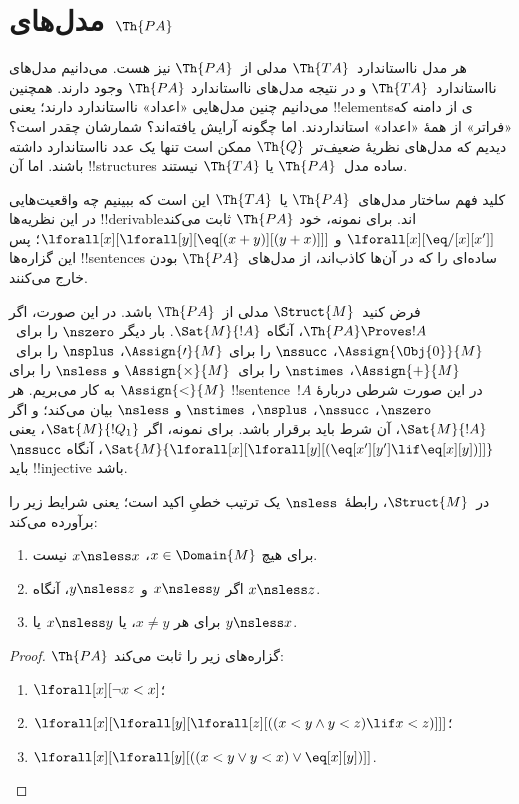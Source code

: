 \documentclass[../../../include/open-logic-section]{subfiles}
\begin{document}
\section{مدل‌های $\Th{PA}$}

\begin{explain}
هر مدل نااستاندارد~$\Th{TA}$ مدلی از~$\Th{PA}$ نیز هست. می‌دانیم
مدل‌های نااستاندارد~$\Th{TA}$ و در نتیجه مدل‌های نااستاندارد
$\Th{PA}$ وجود دارند. همچنین می‌دانیم چنین مدل‌هایی «اعداد»
نااستاندارد دارند؛ یعنی !!{element}sی از دامنه که «فراتر» از همهٔ
«اعداد» استانداردند. اما چگونه آرایش یافته‌اند؟ شمارشان چقدر است؟
دیدیم که مدل‌های نظریهٔ ضعیف‌تر~$\Th{Q}$ ممکن است تنها یک عدد
نااستاندارد داشته باشند. اما آن !!{structure}s ساده مدل~$\Th{PA}$ یا
$\Th{TA}$ نیستند.

کلید فهم ساختار مدل‌های~$\Th{PA}$ یا~$\Th{TA}$ این است که ببینیم چه
واقعیت‌هایی در این نظریه‌ها !!{derivable}اند. برای نمونه، خود
$\Th{PA}$ ثابت می‌کند
$\lforall[x][\eq/[x][x']]$ و
$\lforall[x][\lforall[y][\eq[(x+y)][(y+x)]]]$؛ پس این گزاره‌ها
!!{sentence}s ساده‌ای را که در آن‌ها کاذب‌اند، از مدل‌های~$\Th{PA}$
بودن خارج می‌کنند.

فرض کنید~$\Struct{M}$ مدلی از~$\Th{PA}$ باشد. در این صورت، اگر
$\Th{PA} \Proves !A$، آنگاه $\Sat{M}{!A}$. بار دیگر
$\nszero$ را برای~$\Assign{\Obj{0}}{M}$، $\nssucc$ را برای
$\Assign{\prime}{M}$، $\nsplus$ را برای~$\Assign{+}{M}$،
$\nstimes$ را برای~$\Assign{\times}{M}$ و $\nsless$ را برای
$\Assign{<}{M}$ به کار می‌بریم. هر !!{sentence}~$!A$ در این صورت
شرطی دربارهٔ $\nszero$، $\nssucc$، $\nsplus$، $\nstimes$ و
$\nsless$ بیان می‌کند؛ و اگر $\Sat{M}{!A}$، آن شرط باید برقرار باشد.
برای نمونه، اگر $\Sat{M}{!Q_1}$، یعنی
$\Sat{M}{\lforall[x][\lforall[y][(\eq[x'][y'] \lif \eq[x][y])]]}$،
آنگاه $\nssucc$ باید !!{injective} باشد.
\end{explain}

\begin{prop}
در~$\Struct{M}$، رابطهٔ~$\nsless$ یک ترتیب خطیِ اکید است؛ یعنی شرایط
زیر را برآورده می‌کند:
\begin{enumerate}
\item برای هیچ $x \in \Domain{M}$، $x \nsless x$ نیست.
\item اگر $x \nsless y$ و $y \nsless z$، آنگاه $x \nsless z$.
\item برای هر $x \neq y$، یا $x \nsless y$ یا $y \nsless x$.
\end{enumerate}
\end{prop}

\begin{proof}
$\Th{PA}$ گزاره‌های زیر را ثابت می‌کند:
\begin{enumerate}
\item $\lforall[x][\lnot x < x]$؛
\item $\lforall[x][\lforall[y][\lforall[z][((x < y \land y < z) \lif x < z)]]]$؛
\item $\lforall[x][\lforall[y][((x < y \lor y < x) \lor \eq[x][y])]]$.
\end{enumerate}
\end{proof}
\end{document}
